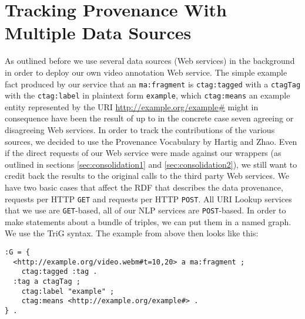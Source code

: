 \documentclass{acm_proc_article-sp}
\begin{document}
\section{Tracking Provenance With Multiple Data Sources}\label{sec:tracking}
As outlined before we use several data sources (Web services) in the background in order to deploy our own video annotation Web service. The simple example fact produced by our service that an \texttt{ma:fragment} is \texttt{ctag:tagged} with a \texttt{ctagTag} with the \texttt{ctag:label} in plaintext form \texttt{example}, which \texttt{ctag:means} an example entity represented by the URI \url{http://example.org/example#} might in consequence have been the result of up to in the concrete case seven agreeing or disagreeing Web services. In order to track the contributions of the various sources, we decided to use the Provenance Vocabulary\cite{Hartig:Provenance} by Hartig and Zhao. Even if the direct requests of our Web service were made against our wrappers (as outlined in sections \ref{sec:consolidation1} and \ref{sec:consolidation2}), we still want to credit back the results to the original calls to the third party Web services. We have two basic cases that affect the RDF that describes the data provenance, requests per HTTP \texttt{GET} and requests per HTTP \texttt{POST}. All URI Lookup services that we use are \texttt{GET}-based, all of our NLP services are \texttt{POST}-based. In order to make statements about a bundle of triples, we can put them in a named graph. We use the TriG\cite{Bizer:TriG} syntax. The example from above then looks like this:
\begin{verbatim}
:G = {
  <http://example.org/video.webm#t=10,20> a ma:fragment ;
    ctag:tagged :tag .
  :tag a ctagTag ;
    ctag:label "example" ;
    ctag:means <http://example.org/example#> .
} .
\end{verbatim}
\end{document}
